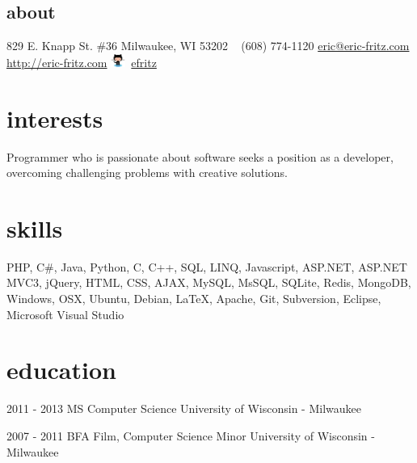 \documentclass[]{fritz-resume}
\begin{document}


\begin{aside}
  \section{about}
    829 E. Knapp St. \#36
    Milwaukee, WI 53202
    ~
    (608) 774-1120
    \href{mailto:eric@eric-fritz.com?subject=Resume}{eric@eric-fritz.com}
    \href{http://eric-fritz.com}{http://eric-fritz.com}
    \includegraphics[height=12pt]{github.eps}~\href{http://github.com/efritz}{efritz}
\end{aside}


\section{interests}

{\small Programmer who is passionate about software seeks a position as a developer, overcoming challenging problems with creative solutions.}


\section{skills}

{\small PHP, C\#, Java, Python, C, C++, SQL, LINQ, Javascript, ASP.NET, ASP.NET MVC3, jQuery, HTML, CSS, AJAX, MySQL, MsSQL, SQLite, Redis, MongoDB, Windows, OSX, Ubuntu, Debian, \LaTeX{}, Apache, Git, Subversion, Eclipse, Microsoft Visual Studio}


\section{education}

\begin{entrylist}
  \entry
    {2011 - 2013}
    {MS Computer Science}
    {University of Wisconsin - Milwaukee}
    {
       \\
    }

  \entry
    {2007 - 2011}
    {BFA Film, Computer Science Minor}
    {University of Wisconsin - Milwaukee}
    {
       \\
    }
\end{entrylist}
\end{document}
